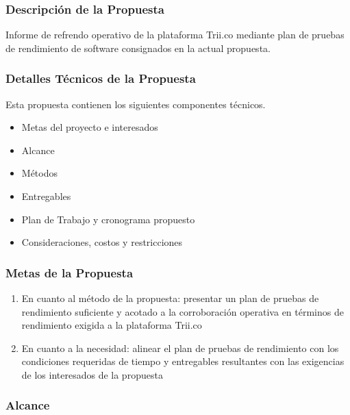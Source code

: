 \documentclass[
  paper=a4,
  ,captions=tableheading
]{scrartcl}
\providecommand{\tightlist}{%
  \setlength{\itemsep}{0pt}\setlength{\parskip}{0pt}}
\begin{document}
\subsubsection{Descripción de la
Propuesta}\label{sec:descripciuxf3n-de-la-propuesta}

Informe de refrendo operativo de la plataforma Trii.co mediante plan de
pruebas de rendimiento de software consignados en la actual propuesta.

\subsubsection{Detalles Técnicos de la
Propuesta}\label{sec:detalles-tuxe9cnicos-de-la-propuesta}

Esta propuesta contienen los siguientes componentes técnicos.

\begin{itemize}
\tightlist
\item
  Metas del proyecto e interesados
\item
  Alcance
\item
  Métodos
\item
  Entregables
\item
  Plan de Trabajo y cronograma propuesto
\item
  Consideraciones, costos y restricciones
\end{itemize}

\subsubsection{Metas de la Propuesta}\label{sec:metas-de-la-propuesta}

\begin{enumerate}
\def\labelenumi{\arabic{enumi}.}
\tightlist
\item
  En cuanto al método de la propuesta: presentar un plan de pruebas de
  rendimiento suficiente y acotado a la corroboración operativa en
  términos de rendimiento exigida a la plataforma Trii.co
\item
  En cuanto a la necesidad: alinear el plan de pruebas de rendimiento
  con los condiciones requeridas de tiempo y entregables resultantes con
  las exigencias de los interesados de la propuesta
\end{enumerate}

\subsubsection{Alcance}\label{sec:alcance}
\end{document}
